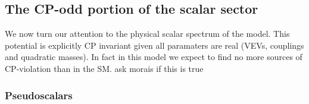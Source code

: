 
\subsection{The CP-odd portion of the scalar sector}
We now turn our attention to the physical scalar spectrum of the model. 
%
This potential is explicitly CP invariant given all paramaters are real (VEVs, couplings and quadratic masses). In fact in this model we expect to find no more sources of CP-violation than in the SM. { \color{blue} ask morais if this is true } 

\subsubsection{Pseudoscalars}

